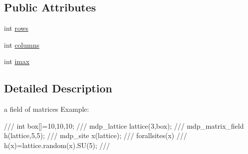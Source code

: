 \subsection*{Public Attributes}
\begin{DoxyCompactItemize}
\item 
int \hyperlink{classmdp__matrix__field_ac19f5807ad30e73c0362753a6b04c491}{rows}
\item 
int \hyperlink{classmdp__matrix__field_aed230e738036a9f78c46089fe3710a53}{columns}
\item 
int \hyperlink{classmdp__matrix__field_a36e86a01ec41e2c0c67194091119c835}{imax}
\end{DoxyCompactItemize}


\subsection{Detailed Description}
a field of matrices Example: \begin{DoxyVerb}
///    int box[]={10,10,10};
///    mdp_lattice lattice(3,box);
///    mdp_matrix_field h(lattice,5,5);
///    mdp_site x(lattice);
///    forallsites(x)
///       h(x)=lattice.random(x).SU(5);
/// \end{DoxyVerb}
 

